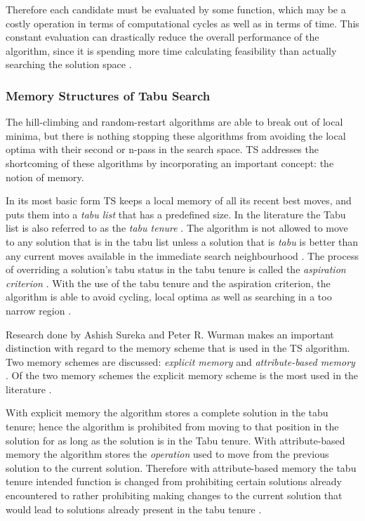 Therefore each candidate must be evaluated by some function, which may be a costly operation in terms of computational cycles as well as in terms of time\cite{EvoParallelTabu,TabuVechicleRoutingWithTimeWindows}. This constant evaluation can drastically reduce the overall performance of the algorithm, since it is spending more time calculating feasibility than actually searching the solution space \cite{EvoParallelTabu,TabuVechicleRoutingWithTimeWindows}. 

\subsubsection{Memory Structures of Tabu Search}
The hill-climbing and random-restart algorithms are able to break out of local minima, but there is nothing stopping these algorithms from avoiding the local optima with their second or n-pass in the search space. TS addresses the shortcoming of these algorithms by incorporating an important concept: the notion of memory.

In its most basic form TS keeps a local memory of all its recent best moves, and puts them into a \emph{tabu list} that has a predefined size. In the literature the Tabu list is also referred to as the \emph{tabu tenure} \cite{TSHazardous,TabuCarryOver,ReactiveTabuVHR,TabuParameterization}. The algorithm is not allowed to move to any solution that is in the tabu list unless a solution that is \emph{tabu} is better than any current moves available in the immediate search neighbourhood \cite{TSHazardous,TabuCarryOver,ReactiveTabuVHR,TabuParameterization}. The process of overriding a solution's tabu status in the tabu tenure is called the \emph{aspiration criterion} \cite{TSHazardous,TabuCarryOver,ReactiveTabuVHR,TabuParameterization}. With the use of the tabu tenure and the aspiration criterion, the algorithm is able to avoid cycling, local optima as well as searching in a too narrow region \cite{TabuSingleMachineScheduling,CircuitTabu}.

Research done by Ashish Sureka and Peter R. Wurman makes an important distinction with regard to the memory scheme that is used in the TS algorithm. Two memory schemes are discussed: \emph{explicit memory} and \emph{attribute-based memory} \cite{TabuBiddingStrats,TabuFormGames}. Of the two memory schemes the explicit memory scheme is the most used in the literature \cite{TabuVechicleRoutingWithTimeWindows}.

With explicit memory the algorithm stores a complete solution in the tabu tenure; hence the algorithm is prohibited from moving to that position in the solution for as long as the solution is in the Tabu tenure\cite{TabuBiddingStrats,TabuFormGames}. With attribute-based memory the algorithm stores the \emph{operation} used to move from the previous solution to the current solution\cite{TabuBiddingStrats,TabuFormGames}. Therefore with attribute-based memory the tabu tenure intended function is changed from prohibiting certain solutions already encountered to rather prohibiting making changes to the current solution that would lead to solutions already present in the tabu tenure \cite{TabuBiddingStrats,TabuFormGames}.

